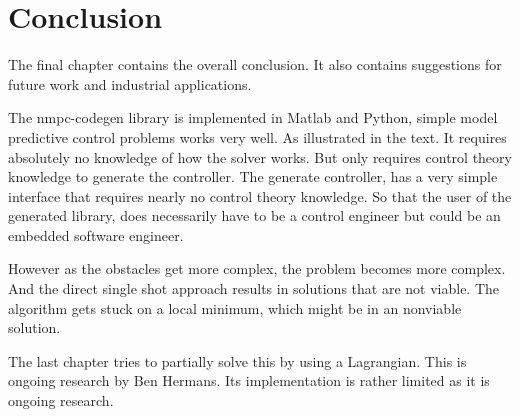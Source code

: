 \chapter{Conclusion}
The final chapter contains the overall conclusion. It also contains
suggestions for future work and industrial applications.

The nmpc-codegen library is implemented in Matlab and Python, simple model predictive control problems works very well. As illustrated in the text. It requires absolutely no knowledge of how the solver works. But only requires control theory knowledge to generate the controller. The generate controller, has a very simple interface that requires nearly no control theory knowledge. So that the user of the generated library, does necessarily have to be a control engineer but could be an embedded software engineer.

However as the obstacles get more complex, the problem becomes more complex. And the direct single shot approach results in solutions that are not viable. The algorithm gets stuck on a local minimum, which might be in an nonviable solution.

The last chapter tries to partially solve this by using a Lagrangian. This is ongoing research by Ben Hermans. Its implementation is rather limited as it is ongoing research.

